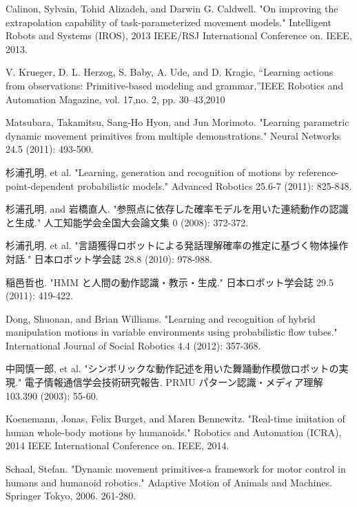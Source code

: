 ﻿%
\begin{thebibliography}{99}%
Calinon, Sylvain, Tohid Alizadeh, and Darwin G. Caldwell. "On improving the extrapolation capability of task-parameterized movement models." Intelligent Robots and Systems (IROS), 2013 IEEE/RSJ International Conference on. IEEE, 2013.

V. Krueger, D. L. Herzog, S. Baby, A. Ude, and D. Kragic, “Learning actions from observations: Primitive-based modeling and grammar,”IEEE Robotics and Automation Magazine, vol. 17,no. 2, pp. 30–43,2010

Matsubara, Takamitsu, Sang-Ho Hyon, and Jun Morimoto. "Learning parametric dynamic movement primitives from multiple demonstrations." Neural Networks 24.5 (2011): 493-500.

杉浦孔明, et al. "Learning, generation and recognition of motions by reference-point-dependent probabilistic models." Advanced Robotics 25.6-7 (2011): 825-848.

杉浦孔明, and 岩橋直人. "参照点に依存した確率モデルを用いた連続動作の認識と生成." 人工知能学会全国大会論文集 0 (2008): 372-372.

杉浦孔明, et al. "言語獲得ロボットによる発話理解確率の推定に基づく物体操作対話." 日本ロボット学会誌 28.8 (2010): 978-988.

稲邑哲也. "HMM と人間の動作認識・教示・生成." 日本ロボット学会誌 29.5 (2011): 419-422.

Dong, Shuonan, and Brian Williams. "Learning and recognition of hybrid manipulation motions in variable environments using probabilistic flow tubes." International Journal of Social Robotics 4.4 (2012): 357-368.

中岡慎一郎, et al. "シンボリックな動作記述を用いた舞踊動作模倣ロボットの実現." 電子情報通信学会技術研究報告. PRMU パターン認識・メディア理解 103.390 (2003): 55-60.

Koenemann, Jonas, Felix Burget, and Maren Bennewitz. "Real-time imitation of human whole-body motions by humanoids." Robotics and Automation (ICRA), 2014 IEEE International Conference on. IEEE, 2014.

Schaal, Stefan. "Dynamic movement primitives-a framework for motor control in humans and humanoid robotics." Adaptive Motion of Animals and Machines. Springer Tokyo, 2006. 261-280.


\end{thebibliography}
